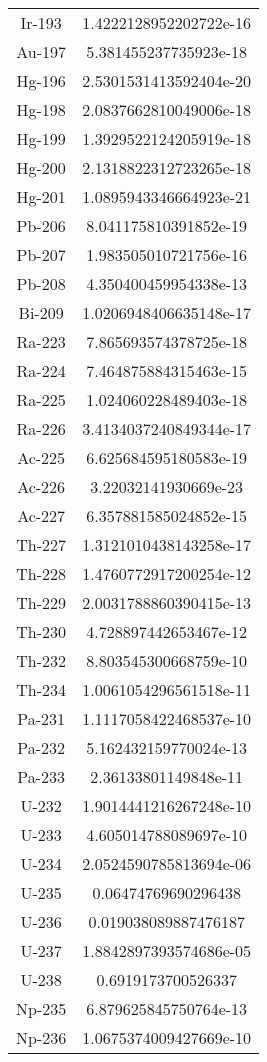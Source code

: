 \begin{table}[h!]
\begin{tabular}{|| c || c |}
Ir-193 & 1.4222128952202722e-16 \\
Au-197 & 5.381455237735923e-18 \\
Hg-196 & 2.5301531413592404e-20 \\
Hg-198 & 2.0837662810049006e-18 \\
Hg-199 & 1.3929522124205919e-18 \\
Hg-200 & 2.1318822312723265e-18 \\
Hg-201 & 1.0895943346664923e-21 \\
Pb-206 & 8.041175810391852e-19 \\
Pb-207 & 1.983505010721756e-16 \\
Pb-208 & 4.350400459954338e-13 \\
Bi-209 & 1.0206948406635148e-17 \\
Ra-223 & 7.865693574378725e-18 \\
Ra-224 & 7.464875884315463e-15 \\
Ra-225 & 1.024060228489403e-18 \\
Ra-226 & 3.4134037240849344e-17 \\
Ac-225 & 6.625684595180583e-19 \\
Ac-226 & 3.22032141930669e-23 \\
Ac-227 & 6.357881585024852e-15 \\
Th-227 & 1.3121010438143258e-17 \\
Th-228 & 1.4760772917200254e-12 \\
Th-229 & 2.0031788860390415e-13 \\
Th-230 & 4.728897442653467e-12 \\
Th-232 & 8.803545300668759e-10 \\
Th-234 & 1.0061054296561518e-11 \\
Pa-231 & 1.1117058422468537e-10 \\
Pa-232 & 5.162432159770024e-13 \\
Pa-233 & 2.36133801149848e-11 \\
U-232 & 1.9014441216267248e-10 \\
U-233 & 4.605014788089697e-10 \\
U-234 & 2.0524590785813694e-06 \\
U-235 & 0.06474769690296438 \\
U-236 & 0.019038089887476187 \\
U-237 & 1.8842897393574686e-05 \\
U-238 & 0.6919173700526337 \\
Np-235 & 6.879625845750764e-13 \\
Np-236 & 1.0675374009427669e-10 \\

\end{tabular}
\end{table}
